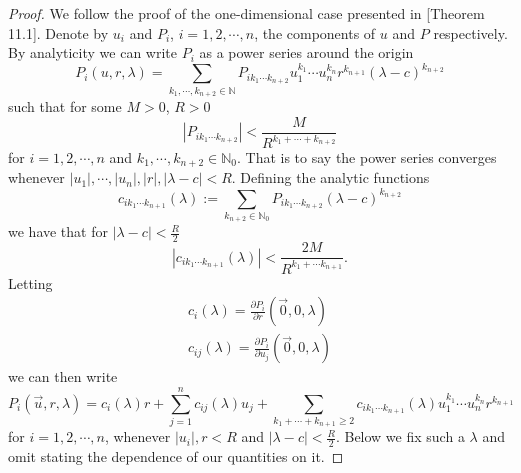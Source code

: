 \documentclass{amsart}
\theoremstyle{definition}
\theoremstyle{remark}
\numberwithin{equation}{section}
\newcommand{\N}{\mathbb{N}}
\begin{document}
\begin{proof}
We follow the proof of the one-dimensional case presented in \cite{H79}[Theorem 11.1]. Denote by $u_i$ and $P_i$, $i = 1, 2, \cdots, n$, the components of $u$ and $P$ respectively. By analyticity we can write $P_i$ as a power series around the origin
\begin{equation*}
P_i(u,r, \lambda) = \sum_{k_1, \cdots, k_{n+2} \in \N} P_{i k_1 \cdots k_{n+2}} u_1^{k_1} \cdots u_n^{k_n} r^{k_{n+1}} \left(\lambda - c \right)^{k_{n+2}} 
\end{equation*}
such that for some $M > 0$, $R>0$ 
\begin{equation*}
|P_{i k_1 \cdots k_{n+2}}| < \frac{M}{R^{k_1 + \cdots + k_{n+2}}}
\end{equation*}
for $i = 1, 2, \cdots, n$ and $k_1, \cdots, k_{n+2} \in \N_{0}$. That is to say the power series converges whenever $|u_1|, \cdots, |u_n|, |r|, |\lambda -c| < R$. Defining the analytic functions
\begin{equation*}
c_{i k_1 \cdots k_{n+1}}(\lambda) := \sum_{k_{n+2} \in \N_0} P_{i k_1 \cdots k_{n+2}}(\lambda-c)^{k_{n+2}}
\end{equation*}
we have that for $|\lambda - c| < \frac{R}{2}$ 
\begin{equation*}
 \left|c_{i k_1 \cdots k_{n+1}}(\lambda)\right| < \frac{2M}{R^{k_1 + \cdots k_{n+1}}}.
\end{equation*}
Letting
\begin{align*}
c_i(\lambda) = \frac{\partial P_i}{\partial r} (\vec{0},0, \lambda) \\
c_{ij}(\lambda)  = \frac{\partial P_i}{\partial u_j} (\vec{0},0, \lambda)
\end{align*}
we can then write
\begin{equation*}
P_i(\vec{u},r, \lambda) = c_i(\lambda) r + \sum_{j= 1}^n c_{ij}(\lambda) u_{j} + \sum_{k_1 + \cdots + k_{n+1} \geq 2} c_{i k_1 \cdots k_{n+1}}(\lambda) u_1^{k_1} \cdots u_n^{k_n} r^{k_{n+1}}
\end{equation*}
for $i = 1, 2, \cdots, n$, whenever $|u_i|, r < R$ and $|\lambda - c| < \frac{R}{2}$. Below we fix such a $\lambda$ and omit stating the dependence of our quantities on it. 


\end{proof}
\end{document}

